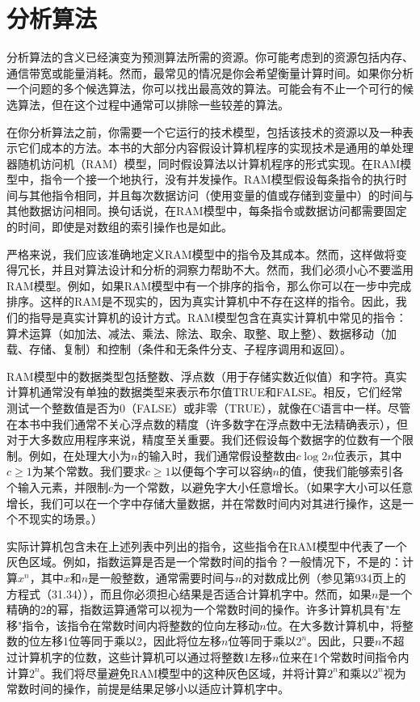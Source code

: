 \documentclass[lang=cn,newtx,10pt,scheme=chinese]{elegantbook}
\begin{document}
\section{分析算法}

分析算法的含义已经演变为预测算法所需的资源。你可能考虑到的资源包括内存、通信带宽或能量消耗。然而，最常见的情况是你会希望衡量计算时间。如果你分析一个问题的多个候选算法，你可以找出最高效的算法。可能会有不止一个可行的候选算法，但在这个过程中通常可以排除一些较差的算法。

在你分析算法之前，你需要一个它运行的技术模型，包括该技术的资源以及一种表示它们成本的方法。本书的大部分内容假设计算机程序的实现技术是通用的单处理器随机访问机（RAM）模型，同时假设算法以计算机程序的形式实现。在RAM模型中，指令一个接一个地执行，没有并发操作。RAM模型假设每条指令的执行时间与其他指令相同，并且每次数据访问（使用变量的值或存储到变量中）的时间与其他数据访问相同。换句话说，在RAM模型中，每条指令或数据访问都需要固定的时间，即使是对数组的索引操作也是如此。

严格来说，我们应该准确地定义RAM模型中的指令及其成本。然而，这样做将变得冗长，并且对算法设计和分析的洞察力帮助不大。然而，我们必须小心不要滥用RAM模型。例如，如果RAM模型中有一个排序的指令，那么你可以在一步中完成排序。这样的RAM是不现实的，因为真实计算机中不存在这样的指令。因此，我们的指导是真实计算机的设计方式。RAM模型包含在真实计算机中常见的指令：算术运算（如加法、减法、乘法、除法、取余、取整、取上整）、数据移动（加载、存储、复制）和控制（条件和无条件分支、子程序调用和返回）。

RAM模型中的数据类型包括整数、浮点数（用于存储实数近似值）和字符。真实计算机通常没有单独的数据类型来表示布尔值TRUE和FALSE。相反，它们经常测试一个整数值是否为0（FALSE）或非零（TRUE），就像在C语言中一样。尽管在本书中我们通常不关心浮点数的精度（许多数字在浮点数中无法精确表示），但对于大多数应用程序来说，精度至关重要。我们还假设每个数据字的位数有一个限制。例如，在处理大小为$n$的输入时，我们通常假设整数由$c\log 2n$位表示，其中$c \ge 1$为某个常数。我们要求$c \ge 1$以便每个字可以容纳$n$的值，使我们能够索引各个输入元素，并限制$c$为一个常数，以避免字大小任意增长。（如果字大小可以任意增长，我们可以在一个字中存储大量数据，并在常数时间内对其进行操作，这是一个不现实的场景。）

实际计算机包含未在上述列表中列出的指令，这些指令在RAM模型中代表了一个灰色区域。例如，指数运算是否是一个常数时间的指令？一般情况下，不是的：计算$x^n$，其中$x$和$n$是一般整数，通常需要时间与$n$的对数成比例（参见第934页上的方程式（31.34）），而且你必须担心结果是否适合计算机字中。然而，如果$n$是一个精确的2的幂，指数运算通常可以视为一个常数时间的操作。许多计算机具有"左移"指令，该指令在常数时间内将整数的位向左移动$n$位。在大多数计算机中，将整数的位左移1位等同于乘以2，因此将位左移$n$位等同于乘以$2^n$。因此，只要$n$不超过计算机字的位数，这些计算机可以通过将整数1左移$n$位来在1个常数时间指令内计算$2^n$。我们将尽量避免RAM模型中的这种灰色区域，并将计算$2^n$和乘以$2^n$视为常数时间的操作，前提是结果足够小以适应计算机字中。
\end{document}
